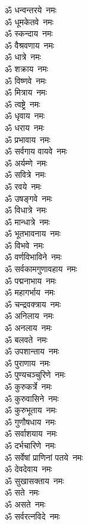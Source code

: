 \begin{multicols}{2}
\begin{flushleft}
ॐ धन्वन्तरये~नमः\\
ॐ धूमकेतवे~नमः\\
ॐ स्कन्दाय~नमः\\
ॐ वैश्रवणाय~नमः\\
ॐ धात्रे~नमः\\
ॐ शक्राय~नमः\hfill{}\\
ॐ विष्णवे~नमः\\
ॐ मित्राय~नमः\\
ॐ त्वष्ट्रे~नमः\\
ॐ धृवाय~नमः\\
ॐ धराय~नमः\\
ॐ प्रभावाय~नमः\\
ॐ सर्वगाय वायवे~नमः\\
ॐ अर्यम्णे~नमः\\
ॐ सवित्रे~नमः\\
ॐ रवये~नमः\hfill{}\\
ॐ उषङ्गवे~नमः\\
ॐ विधात्रे~नमः\\
ॐ मान्धात्रे~नमः\\
ॐ भूतभावनाय~नमः\\
ॐ विभवे~नमः\\
ॐ वर्णविभाविने~नमः\\
ॐ सर्वकामगुणावहाय~नमः\\
ॐ पद्मनाभाय~नमः\\
ॐ महागर्भाय~नमः\\
ॐ चन्द्रवक्त्राय~नमः\hfill{}\\
ॐ अनिलाय~नमः\\
ॐ अनलाय~नमः\\
ॐ बलवते~नमः\\
ॐ उपशान्ताय~नमः\\
ॐ पुराणाय~नमः\\
ॐ पुण्यचञ्चुरिणे~नमः\\
ॐ कुरुकर्त्रे~नमः\\
ॐ कुरुवासिने~नमः\\
ॐ कुरुभूताय~नमः\\
ॐ गुणौषधाय~नमः\hfill{}\\
ॐ सर्वाशयाय~नमः\\
ॐ दर्भचारिणे~नमः\\
ॐ सर्वेषां प्राणिनां पतये~नमः\\
ॐ देवदेवाय~नमः\\
ॐ सुखासक्ताय~नमः\\
ॐ सते~नमः\\
ॐ असते~नमः\\
ॐ सर्वरत्नविदे~नमः\\

\end{flushleft}
\end{multicols}
